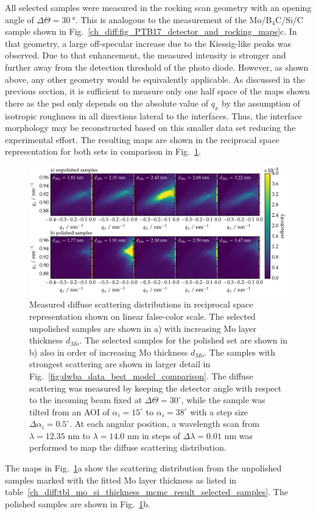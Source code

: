 All selected samples were measured in the rocking scan geometry with an opening angle of $\Delta \Theta = \SI{30}{\degree}$. This is analogous to the measurement of the Mo/B$_4$C/Si/C sample shown in Fig.~\ref{ch_diff:fig_PTB17_detector_and_rocking_maps}c. In that geometry, a large off-specular increase due to the Kiessig-like peaks was observed. Due to that enhancement, the measured intensity is stronger and further away from the detection threshold of the photo diode. However, as shown above, any other geometry would be equivalently applicable. As discussed in the previous section, it is sufficient to measure only one half space of the maps shown there as the \gls{psd} only depends on the absolute value of $q_x$ by the assumption of isotropic roughness in all directions lateral to the interfaces. Thus, the interface morphology may be reconstructed based on this smaller data set reducing the experimental effort. The resulting maps are shown in the reciprocal space representation for both sets in comparison in Fig.~\ref{ch_diff:fig_mo_si_c_diffuse}.
\begin{figure}[htbp]
\centering
\includegraphics[width=\textwidth]{img/MoSiC_diffuse_measurements}
\caption{Measured diffuse scattering distributions in reciprocal space representation shown on linear false-color scale. The selected unpolished samples are shown in a) with increasing Mo layer thickness $d_{Mo}$. The selected samples for the polished set are shown in b) also in order of increasing Mo thickness $d_{Mo}$. The samples with strongest scattering are shown in larger detail in Fig.~\ref{fig:dwba_data_best_model_comparison}. The diffuse scattering was measured by keeping the detector angle with respect to the incoming beam fixed at $\Delta\Theta = 30^\circ$, while the sample was tilted from an AOI of $\alpha_i=15^\circ$ to $\alpha_i=38^\circ$ with a step size $\Delta\alpha_i = 0.5^\circ$. At each angular position, a wavelength scan from $\lambda=12.35$ nm to $\lambda=14.0$ nm in steps of $\Delta\lambda = 0.01$ nm was performed to map the diffuse scattering distribution.}
\label{ch_diff:fig_mo_si_c_diffuse}
\end{figure}
The maps in Fig.~\ref{ch_diff:fig_mo_si_c_diffuse}a show the scattering distribution from the unpolished samples marked with the fitted Mo layer thickness as listed in table~\ref{ch_diff:tbl_mo_si_thickness_mcmc_result_selected_samples}. The polished samples are shown in Fig.~\ref{ch_diff:fig_mo_si_c_diffuse}b.

